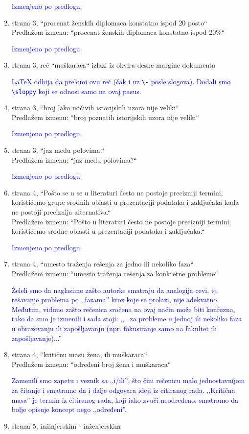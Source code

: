 \documentclass[a4paper]{report}
\newcommand{\odgovor}[1]{\textcolor{blue}{#1}}
\begin{document}
\begin{enumerate}
\odgovor{Izmenjeno po predlogu.}
\item
strana 3, “procenat ženskih diplomaca konstatno ispod 20 posto“  \\
Predlažem izmenu: “procenat ženskih diplomaca konstatno ispod 20\%“ 

\odgovor{Izmenjeno po predlogu.}
\item
strana 3, reč “muškaraca“ izlazi iz okvira desne margine dokumenta

\odgovor{\LaTeX{} odbija da prelomi ovu reč (čak i uz \texttt{\textbackslash{}-} posle slogova). Dodali smo \texttt{\textbackslash{}sloppy} koji se odnosi samo na ovaj pasus.}
\item
strana 3, “broj lako uočivih istorijskih uzora nije veliki“  \\
Predlažem izmenu: “broj poznatih istorijskih uzora nije veliki“

\odgovor{Izmenjeno po predlogu.}
\item
strana 3, “jaz među polovima.“  \\
Predlažem izmenu: “jaz među polovima?“

\odgovor{Izmenjeno po predlogu.}
\item
strana 4, “Pošto se u se u literaturi često ne postoje precizniji termini, koristićemo grupe srodnih oblasti u prezentaciji podataka i zaključaka kada ne postoji preciznija alternativa.“  \\
Predlažem izmenu: “Pošto u literaturi često ne postoje precizniji termini, koristićemo srodne oblasti u prezentaciji podataka i zaključaka.“

\odgovor{Izmenjeno po predlogu.}
\item
strana 4, “umesto traženja rešenja za jedno ili nekoliko faza“ \\
Predlažem izmenu: “umesto traženja rešenja za konkretne probleme“

\odgovor{Želeli smo da naglasimo zašto autorke smatraju da analogija cevi, tj. rešavanje problema po ,,fazama'' kroz koje se prolazi, nije adekvatno. Međutim, vidimo zašto rečenica sročena na ovaj način može biti konfuzna, tako da smo je izmenili i sada stoji: ,,...za probleme u jednoj ili nekoliko faza u obrazovanju ili zapošljavanju (npr. fokusiranje samo na fakultet ili zapošljavanje)...''}
\item
strana 4, “kritičnu masu žena, ili muškaraca“  \\
Predlažem izmenu: “određeni broj žena i muškaraca“

\odgovor{Zamenili smo zapetu i veznik sa ,,i/ili'', što čini rečenicu malo jednostavnijom za čitanje i smatramo da i dalje odgovara ideji iz citiranog rada. ,,Kritična masa'' je termin iz citiranog rada, koji iako zvuči neodređeno, smatramo da bolje opisuje koncept nego ,,određeni''.}
\item
strana 5,  inžinjerskim - inženjerskim


\end{enumerate}
\end{document}
